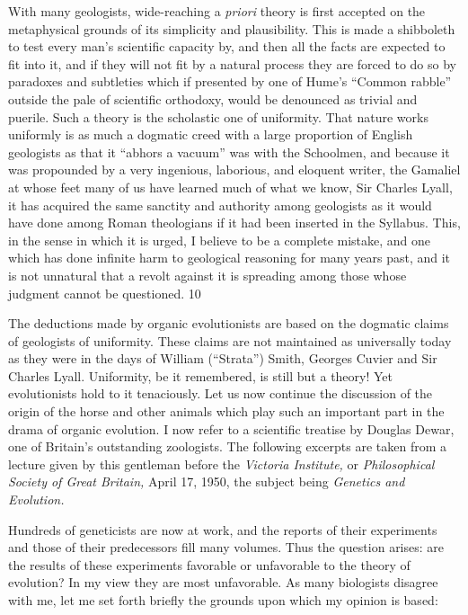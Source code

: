 With many geologists, wide-reaching a \textit{priori} theory is first accepted on the metaphysical
grounds of its simplicity and plausibility. This is made a shibboleth to test every man's
scientific capacity by, and then all the facts are expected to fit into it, and if they will not fit
by a natural process they are forced to do so by paradoxes and subtleties which if presented
by one of Hume's ``Common rabble'' outside the pale of scientific orthodoxy, would be
denounced as trivial and puerile. Such a theory is the scholastic one of uniformity. That
nature works uniformly is as much a dogmatic creed with a large proportion of English
geologists as that it ``abhors a vacuum'' was with the Schoolmen, and because it was
propounded by a very ingenious, laborious, and eloquent writer, the Gamaliel at whose feet
many of us have learned much of what we know, Sir Charles Lyall, it has acquired the same
sanctity and authority among geologists as it would have done among Roman theologians if
it had been inserted in the Syllabus. This, in the sense in which it is urged, I believe to be a
complete mistake, and one which has done infinite harm to geological reasoning for many
years past, and it is not unnatural that a revolt against it is spreading among those whose
judgment cannot be questioned. 10

The deductions made by organic evolutionists are based on the dogmatic claims of geologists
of uniformity. These claims are not maintained as universally today as they were in the days
of William (``Strata'') Smith, Georges Cuvier and Sir Charles Lyall. Uniformity, be it
remembered, is still but a theory! Yet evolutionists hold to it tenaciously. Let us now
continue the discussion of the origin of the horse and other animals which play such an
important part in the drama of organic evolution. I now refer to a scientific treatise by
Douglas Dewar, one of Britain's outstanding zoologists. The following excerpts are taken
from a lecture given by this gentleman before the \textit{Victoria Institute,} or \textit{Philosophical Society
of Great Britain,} April 17, 1950, the subject being \textit{Genetics and Evolution.}

Hundreds of geneticists are now at work, and the reports of their experiments and those of
their predecessors fill many volumes. Thus the question arises: are the results of these
experiments favorable or unfavorable to the theory of evolution? In my view they are most
unfavorable. As many biologists disagree with me, let me set forth briefly the grounds upon
which my opinion is based:

